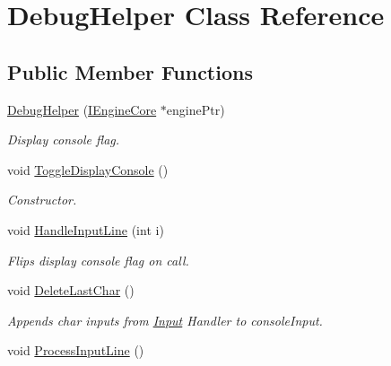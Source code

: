 \hypertarget{class_debug_helper}{\section{Debug\+Helper Class Reference}
\label{class_debug_helper}
}
\subsection*{Public Member Functions}
\begin{DoxyCompactItemize}
\item 
\hypertarget{class_debug_helper_a29d4ff680c7d62a0d291f910b18c726d}{\hyperlink{class_debug_helper_a29d4ff680c7d62a0d291f910b18c726d}{Debug\+Helper} (\hyperlink{class_i_engine_core}{I\+Engine\+Core} $\ast$engine\+Ptr)}\label{class_debug_helper_a29d4ff680c7d62a0d291f910b18c726d}

\begin{DoxyCompactList}\small\item\em Display console flag. \end{DoxyCompactList}\item 
\hypertarget{class_debug_helper_a43b172bef6f51e3a6107438c58050c28}{void \hyperlink{class_debug_helper_a43b172bef6f51e3a6107438c58050c28}{Toggle\+Display\+Console} ()}\label{class_debug_helper_a43b172bef6f51e3a6107438c58050c28}

\begin{DoxyCompactList}\small\item\em Constructor. \end{DoxyCompactList}\item 
\hypertarget{class_debug_helper_af65921d69c5e05bedb84ddd3b961a7fa}{void \hyperlink{class_debug_helper_af65921d69c5e05bedb84ddd3b961a7fa}{Handle\+Input\+Line} (int i)}\label{class_debug_helper_af65921d69c5e05bedb84ddd3b961a7fa}

\begin{DoxyCompactList}\small\item\em Flips display console flag on call. \end{DoxyCompactList}\item 
\hypertarget{class_debug_helper_a280c80f783830b516fc2cfe3c48646c9}{void \hyperlink{class_debug_helper_a280c80f783830b516fc2cfe3c48646c9}{Delete\+Last\+Char} ()}\label{class_debug_helper_a280c80f783830b516fc2cfe3c48646c9}

\begin{DoxyCompactList}\small\item\em Appends char inputs from \hyperlink{class_input}{Input} Handler to console\+Input. \end{DoxyCompactList}\item 
\hypertarget{class_debug_helper_a1a58402827749bbe28318387936de404}{void \hyperlink{class_debug_helper_a1a58402827749bbe28318387936de404}{Process\+Input\+Line} ()}\label{class_debug_helper_a1a58402827749bbe28318387936de404}


\end{DoxyCompactItemize}
